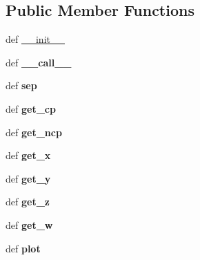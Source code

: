 \subsection*{\-Public \-Member \-Functions}
\begin{DoxyCompactItemize}
\item 
def \hyperlink{classbezier_1_1Bezier_aa707e7f9dc64a98300877e9ce35e1cc3}{\-\_\-\-\_\-init\-\_\-\-\_\-}
\item 
\hypertarget{classbezier_1_1Bezier_ac23b42e2b53d6810f740099e28bee1cf}{def {\bfseries \-\_\-\-\_\-call\-\_\-\-\_\-}}\label{classbezier_1_1Bezier_ac23b42e2b53d6810f740099e28bee1cf}

\item 
\hypertarget{classbezier_1_1Bezier_aa366b876c53289e5fa811594b4923352}{def {\bfseries sep}}\label{classbezier_1_1Bezier_aa366b876c53289e5fa811594b4923352}

\item 
\hypertarget{classbezier_1_1Bezier_a755df32ec3b803a4a37a7b2674a7b8ef}{def {\bfseries get\-\_\-cp}}\label{classbezier_1_1Bezier_a755df32ec3b803a4a37a7b2674a7b8ef}

\item 
\hypertarget{classbezier_1_1Bezier_a5f731613c2f00dfbd6c97baf358fa53f}{def {\bfseries get\-\_\-ncp}}\label{classbezier_1_1Bezier_a5f731613c2f00dfbd6c97baf358fa53f}

\item 
\hypertarget{classbezier_1_1Bezier_aba655db92dafafdcaa193dd7fe98bb1e}{def {\bfseries get\-\_\-x}}\label{classbezier_1_1Bezier_aba655db92dafafdcaa193dd7fe98bb1e}

\item 
\hypertarget{classbezier_1_1Bezier_a6b9d505aa730b92dc227afbd05e08ddf}{def {\bfseries get\-\_\-y}}\label{classbezier_1_1Bezier_a6b9d505aa730b92dc227afbd05e08ddf}

\item 
\hypertarget{classbezier_1_1Bezier_ae6aa4066d6ba2c0432b388513a2998d4}{def {\bfseries get\-\_\-z}}\label{classbezier_1_1Bezier_ae6aa4066d6ba2c0432b388513a2998d4}

\item 
\hypertarget{classbezier_1_1Bezier_afa351a65d7f7bee24370ad50c2122a1f}{def {\bfseries get\-\_\-w}}\label{classbezier_1_1Bezier_afa351a65d7f7bee24370ad50c2122a1f}

\item 
\hypertarget{classbezier_1_1Bezier_a77482ccf5e7e4567e0f90b73a5bc8fd8}{def {\bfseries plot}}\label{classbezier_1_1Bezier_a77482ccf5e7e4567e0f90b73a5bc8fd8}

\end{DoxyCompactItemize}


